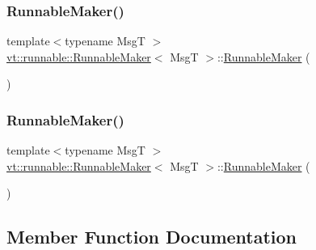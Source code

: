 \subsubsection{\texorpdfstring{Runnable\+Maker()}{RunnableMaker()}\hspace{0.1cm}{\footnotesize\ttfamily [2/3]}}
{\footnotesize\ttfamily template$<$typename MsgT $>$ \\
\hyperlink{structvt_1_1runnable_1_1_runnable_maker}{vt\+::runnable\+::\+Runnable\+Maker}$<$ MsgT $>$\+::\hyperlink{structvt_1_1runnable_1_1_runnable_maker}{Runnable\+Maker} (\begin{DoxyParamCaption}\item[{\hyperlink{structvt_1_1runnable_1_1_runnable_maker}{Runnable\+Maker}$<$ MsgT $>$ const \&}]{ }\end{DoxyParamCaption})\hspace{0.3cm}{\ttfamily [delete]}}

\mbox{\label{structvt_1_1runnable_1_1_runnable_maker_abeee34efa8b7bc1586727bee5f71c6d4}} 
\subsubsection{\texorpdfstring{Runnable\+Maker()}{RunnableMaker()}\hspace{0.1cm}{\footnotesize\ttfamily [3/3]}}
{\footnotesize\ttfamily template$<$typename MsgT $>$ \\
\hyperlink{structvt_1_1runnable_1_1_runnable_maker}{vt\+::runnable\+::\+Runnable\+Maker}$<$ MsgT $>$\+::\hyperlink{structvt_1_1runnable_1_1_runnable_maker}{Runnable\+Maker} (\begin{DoxyParamCaption}\item[{\hyperlink{structvt_1_1runnable_1_1_runnable_maker}{Runnable\+Maker}$<$ MsgT $>$ \&\&}]{ }\end{DoxyParamCaption})\hspace{0.3cm}{\ttfamily [default]}}



\subsection{Member Function Documentation}
\mbox{\label{structvt_1_1runnable_1_1_runnable_maker_a76516d824c744bdd347806012a78e19b}} 
